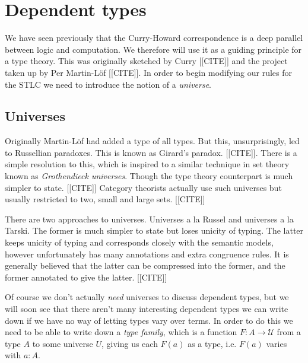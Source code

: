 \section{Dependent types}

We have seen previously that the Curry-Howard correspondence is a deep parallel between logic and computation. We therefore will use it as a guiding principle for a type theory. This was originally sketched by Curry [[CITE]] and the project taken up by Per Martin-L\"of [[CITE]]. In order to begin modifying our rules for the STLC we need to introduce the notion of a \emph{universe}.

\subsection{Universes}

Originally Martin-L\"of had added a type of all types. But this, unsurprisingly, led to Russellian paradoxes. This is known as Girard's paradox. [[CITE]]. There is a simple resolution to this, which is inspired to a similar technique in set theory known as \emph{Grothendieck universes}. Though the type theory counterpart is much simpler to state. [[CITE]] Category theorists actually use such universes but usually restricted to two, small and large sets. [[CITE]]

There are two approaches to universes. Universes a la Russel and universes a la Tarski. The former is much simpler to state but loses unicity of typing. The latter keeps unicity of typing and corresponds closely with the semantic models, however unfortunately has many annotations and extra congruence rules. It is generally believed that the latter can be compressed into the former, and the former annotated to give the latter. [[CITE]]

Of course we don't actually \emph{need} universes to discuss dependent types, but we will soon see that there aren't many interesting dependent types we can write down if we have no way of letting types vary over terms. In order to do this we need to be able to write down a \emph{type family}, which is a function $F : A \to \mathcal{U}$ from a type $A$ to some universe $U$, giving us each $F(a)$ as a type, i.e. $F(a)$ varies with $a:A$.
